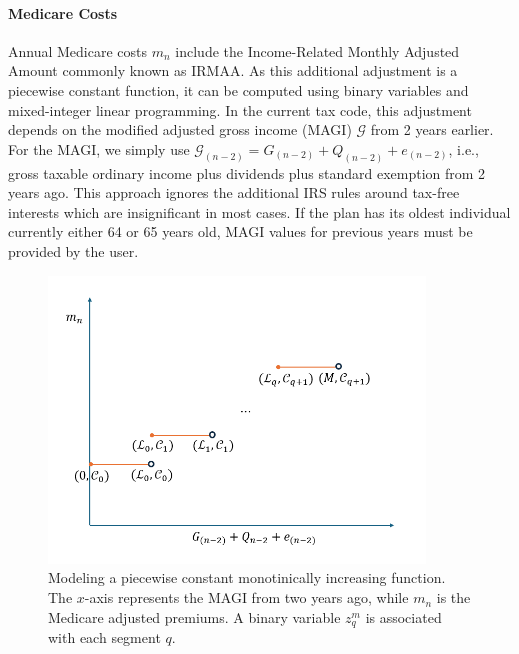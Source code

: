 \documentclass{report}[fleqn,11pt]
\begin{document}
\paragraph*{Medicare Costs}
	Annual Medicare costs $m_n$ include the Income-Related Monthly Adjusted Amount
	commonly known as IRMAA.
	As this additional adjustment
	is a piecewise constant function,
        it can be computed using binary variables and mixed-integer linear
	programming. In the current tax code, this adjustment
	depends on the modified adjusted gross income (MAGI) $\mathcal{G}$ from 2 years earlier. For the
	MAGI, we simply use $\mathcal{G}_{(n-2)} = G_{(n-2)} + Q_{(n-2)} + e_{(n-2)}$, i.e.,
        gross taxable ordinary income
	plus dividends plus standard exemption from 2 years ago. This approach ignores the additional IRS
	rules around tax-free interests which are insignificant in most cases. If the plan
        has its oldest individual currently either 64 or 65 years old, MAGI values for previous years
	must be provided by the user.
	\begin{figure}[t]
	    \center\includegraphics[width=10cm]{piecewiseConstant.png}
	    \caption{\small Modeling a piecewise constant monotinically increasing function.
	    The $x$-axis represents the MAGI from two years ago, while $m_n$ is the Medicare adjusted premiums.
	    A binary variable $z_q^m$ is associated with each segment $q$.
	    \label{Fig:piecewise}}
	\end{figure}
\end{document}
